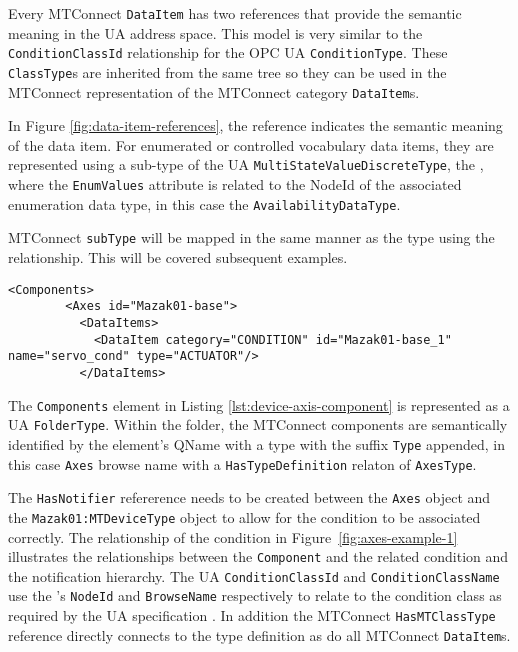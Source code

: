 Every MTConnect \texttt{Data\-Item} has two references that provide the semantic meaning in the UA address space. This model is very similar to the \texttt{Condition\-Class\-Id} relationship for the OPC UA \texttt{Condition\-Type}. These \texttt{Class\-Type}s are inherited from the same tree so they can be used in the MTConnect representation of the MTConnect  category \texttt{Data\-Item}s.



In Figure \ref{fig:data-item-references}, the  reference indicates the semantic meaning of the data item. For enumerated or controlled vocabulary data items, they are represented using a sub-type of the UA \texttt{Multi\-State\-Value\-Discrete\-Type}, the , where the \texttt{Enum\-Values} attribute is related to the NodeId of the associated enumeration data type, in this case the \texttt{Availability\-Data\-Type}.

MTConnect \texttt{subType} will be mapped in the same manner as the type using the  relationship. This will be covered subsequent examples.

\begin{lstlisting}[firstnumber=last,%
    caption={Components and Conditions},label={lst:device-axis-component}]
      <Components>
        <Axes id="Mazak01-base">
          <DataItems>
            <DataItem category="CONDITION" id="Mazak01-base_1" name="servo_cond" type="ACTUATOR"/>
          </DataItems>
\end{lstlisting}

The \texttt{Components} element in Listing \ref{lst:device-axis-component} is represented as a UA \texttt{Folder\-Type}. Within the folder, the MTConnect components are semantically identified by the element's QName with a type with the suffix \texttt{Type} appended, in this case \texttt{Axes} browse name with a \texttt{HasTypeDefinition} relaton of \texttt{AxesType}. 



The \texttt{HasNotifier} refererence needs to be created between the \texttt{Axes} object and the \texttt{Mazak01\-:\-MTDeviceType} object to allow for the condition to be associated correctly. The relationship of the condition in Figure~\ref{fig:axes-example-1} illustrates the relationships between the \texttt{Component} and the related condition and the notification hierarchy. The UA \texttt{Condition\-ClassId} and \texttt{Condition\-ClassName} use the 's \texttt{NodeId} and \texttt{BrowseName} respectively to relate to the condition class as required by the UA specification \cite{UAPart9}. In addition the MTConnect \texttt{HasMTClassType} reference directly connects to the type definition as do all MTConnect \texttt{DataItem}s.

